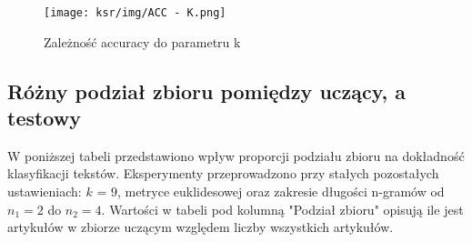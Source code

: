 \documentclass{article}
\begin{document}
\begin{figure}[h!]
    \centering
    \texttt{[image: ksr/img/ACC - K.png]}
    \caption{Zależność accuracy do parametru k}
    \label{fig:moj-obraz}
\end{figure}

\subsection{Różny podział zbioru pomiędzy uczący, a testowy}
W poniższej tabeli przedstawiono wpływ proporcji podziału zbioru na dokładność klasyfikacji tekstów. Eksperymenty przeprowadzono przy stałych pozostałych ustawieniach: \(k\) = 9, metryce euklidesowej oraz zakresie długości n-gramów od \(n_1 = 2\) do \(n_2 = 4\). Wartości w tabeli pod kolumną "Podział zbioru" opisują ile jest artykułów w zbiorze uczącym względem liczby wszystkich artykułów.
\end{document}
